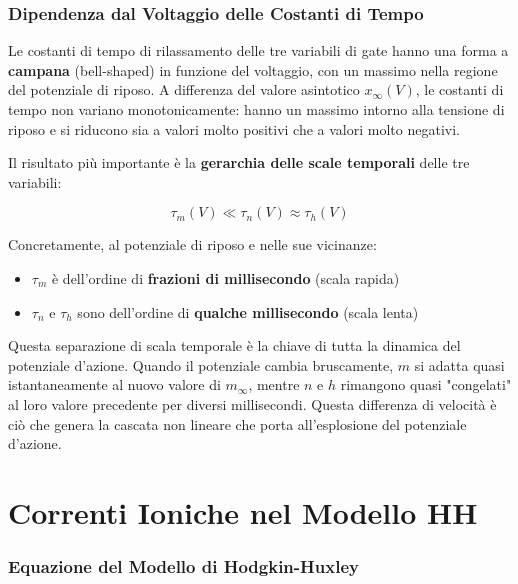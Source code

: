 \subsubsection{Dipendenza dal Voltaggio delle Costanti di Tempo}

Le costanti di tempo di rilassamento delle tre variabili di gate hanno una forma a \textbf{campana} (bell-shaped) in funzione del voltaggio, con un massimo nella regione del potenziale di riposo. A differenza del valore asintotico $x_\infty(V)$, le costanti di tempo non variano monotonicamente: hanno un massimo intorno alla tensione di riposo e si riducono sia a valori molto positivi che a valori molto negativi.

Il risultato più importante è la \textbf{gerarchia delle scale temporali} delle tre variabili:

\begin{equation}
\tau_m(V) \ll \tau_n(V) \approx \tau_h(V)
\end{equation}

Concretamente, al potenziale di riposo e nelle sue vicinanze:
\begin{itemize}
    \item $\tau_m$ è dell'ordine di \textbf{frazioni di millisecondo} (scala rapida)
    \item $\tau_n$ e $\tau_h$ sono dell'ordine di \textbf{qualche millisecondo} (scala lenta)
\end{itemize}



\begin{tcolorbox}[colback=gray!5, colframe=gray!40, arc=2mm, boxrule=0.5pt]
Questa separazione di scala temporale è la chiave di tutta la dinamica del potenziale d'azione. Quando il potenziale cambia bruscamente, $m$ si adatta quasi istantaneamente al nuovo valore di $m_\infty$, mentre $n$ e $h$ rimangono quasi "congelati" al loro valore precedente per diversi millisecondi. Questa differenza di velocità è ciò che genera la cascata non lineare che porta all'esplosione del potenziale d'azione.
\end{tcolorbox}


\section{Correnti Ioniche nel Modello HH}

\subsubsection{Equazione del Modello di Hodgkin-Huxley}

